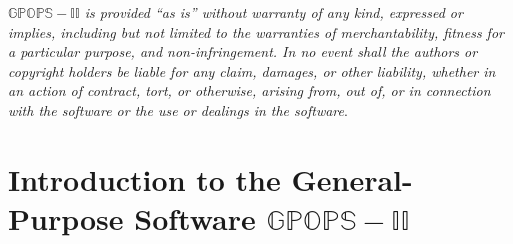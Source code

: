 \documentclass[10pt]{article}
\begin{document}
{\em $\mathbb{GPOPS-II}$ is provided ``as is'' without warranty
of any kind, expressed or implies, including but not limited to the 
warranties of merchantability, fitness for a particular purpose, and
non-infringement.  In no event shall the authors or copyright holders
be liable for any claim, damages, or other liability, whether in an
action of contract, tort, or otherwise, arising from, out of, or in
connection with the software or the use or dealings in the software}.

\clearpage
\setcounter{tocdepth}{2}
\tableofcontents

\clearpage

\section{Introduction to the General-Purpose Software $\mathbb{GPOPS-II}$}
\end{document}
